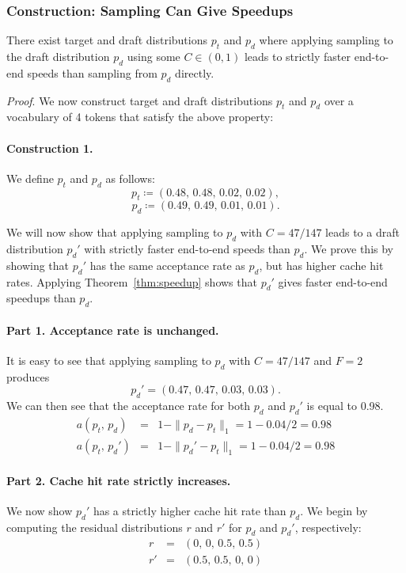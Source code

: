 \subsubsection{Construction: \Sys Sampling Can Give Speedups}
\label{app:saguaro_construction}

\begin{theorem}
There exist target and draft distributions $p_t$ and $p_d$ where applying \Sys sampling to the draft distribution $p_d$ using some $C \in (0,1)$ leads to strictly faster end-to-end speeds than sampling from $p_d$ directly.
\end{theorem}

\textit{Proof}. 
We now construct target and draft distributions $p_t$ and $p_d$ over a vocabulary of 4 tokens that satisfy the above property:

\paragraph{Construction 1.} We define $p_t$ and $p_d$ as follows:
\[
p_t \coloneqq (0.48,\,0.48,\,0.02,\,0.02),
\]
\[
p_d \coloneqq(0.49,\, 0.49,\, 0.01,\, 0.01).
\]

We will now show that applying \Sys sampling to $p_d$ with $C=47/147$ leads to a draft distribution $p_d'$ with strictly faster end-to-end speeds than $p_d$.
We prove this by showing that $p_d'$ has the same acceptance rate as $p_d$, but has higher cache hit rates.
Applying Theorem~\ref{thm:speedup} shows that $p_d'$ gives faster end-to-end speedups than $p_d$.

\paragraph{Part 1. Acceptance rate is unchanged.}
It is easy to see that applying \Sys sampling to $p_d$ with $C = 47/147$ and $F=2$ produces 
\[
p_d' = (0.47,\, 0.47,\, 0.03,\, 0.03).
\]
We can then see that the acceptance rate for both $p_d$ and $p_d'$ is equal to 0.98.
\begin{eqnarray*}
a(p_t,\, p_d) &=& 1 - \|p_d - p_t\|_1 = 1 - 0.04/2 = 0.98 \\
a(p_t,\, p_d') &=& 1 - \|p_d' - p_t\|_1 = 1 - 0.04/2 = 0.98    
\end{eqnarray*}

\paragraph{Part 2. Cache hit rate strictly increases.}
We now show $p_d'$ has a strictly higher cache hit rate than $p_d$.
We begin by computing the residual distributions $r$ and $r'$ for $p_d$ and $p_d'$, respectively:
\begin{eqnarray*}
r &=& (0,\, 0,\, 0.5,\, 0.5) \\
r' &=& (0.5,\, 0.5,\, 0,\, 0)
\end{eqnarray*}


